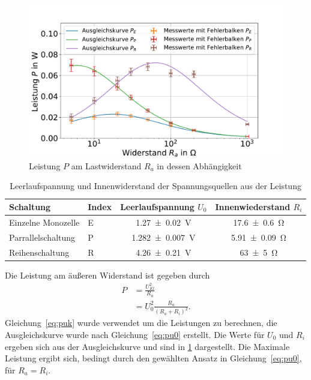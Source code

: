 \FloatBarrier

\begin{figure}[h]
	\centering
	\includegraphics[width=0.9\linewidth]{"auswertung/Auswertung Innenwiderstand/Batterie Gesamt P"}
	\caption{Leistung $P$ am Lastwiderstand $R_a$ in dessen Abhängigkeit}
	\label{fig:batt-ges-p}
\end{figure}



\begin{table}
	\caption{Leerlaufspannung und Innenwiderstand der Spannungsquellen aus der Leistung}
	\centering
	\begin{tabular}{|l l||c|c|}
		\hline 
		Schaltung & Index	& Leerlaufspannung $U_0$ & Innenwiederstand $R_i$ \\ 
		\hline \hline
		Einzelne Monozelle	&E& \SI{1.27+-0.02}{V}  & \SI{17.6+-0.6}{\ohm } \\ 
		\hline  
		Parrallelschaltung	&P& \SI{1.282+-0.007}{V } &\SI{5.91+-0.09}{\ohm }  \\ 
		\hline   
		Reihenschaltung	&R& \SI{4.26+-0.21}{V } &\SI{63+-5}{\ohm }  \\ 
		\hline 
	\end{tabular} 
	
	\label{tab:batt-U-P}
	
\end{table}


Die Leistung am äußeren Widerstand ist gegeben durch 
\begin{align}
 P &=\frac{U_{Kl}^2}{R_a} \label{eq:puk}\\
 &= U_0^2 \frac{R_a}{(R_a+R_i)^2} \label{eq:pu0}.
\end{align} 
Gleichung~\ref{eq:puk} wurde verwendet um die Leistungen zu berechnen, die Ausgleichskurve wurde nach Gleichung~\ref{eq:pu0} erstellt.
Die Werte für $U_0$ und $R_i$ ergeben sich aus der Ausgleichskurve und sind in \cref{tab:batt-U-P} dargestellt. Die Maximale Leistung ergibt sich, bedingt durch den gewählten Ansatz in Gleichung~\ref{eq:pu0}, für $R_a=R_i$. 
